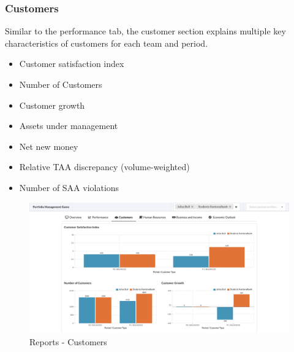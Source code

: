 \subsubsection{Customers}
Similar to the performance tab, the customer section explains multiple key characteristics of customers for each team and period.
\begin{itemize}
  \setlength\itemsep{0.01em}
  \item Customer satisfaction index
  \item Number of Customers
  \item Customer growth
  \item Assets under management
  \item Net new money
  \item Relative TAA discrepancy (volume-weighted)
  \item Number of SAA violations
\end{itemize}
\begin{figure}[h!]
  \centering
  \includegraphics[scale=0.2]{img/application-overview/reports/03_customers.png}
  \caption{Reports - Customers}
\end{figure}

